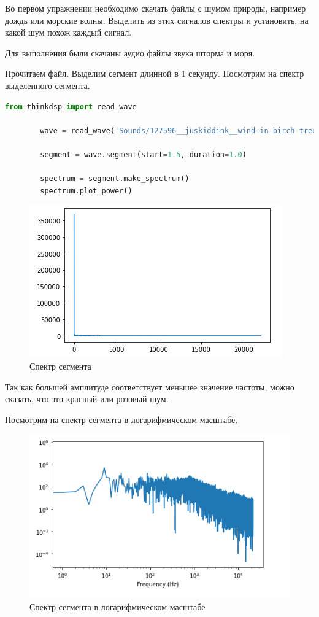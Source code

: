 \documentclass[a4paper, 14pt]{extarticle}
\begin{document}
    Во первом упражнении необходимо скачать файлы с шумом природы, например дождь или морские волны.
    Выделить из этих сигналов спектры и установить, на какой шум похож каждый сигнал.

    Для выполнения были скачаны аудио файлы звука шторма и моря.

    Прочитаем файл.
    Выделим сегмент длинной в 1 секунду.
    Посмотрим на спектр выделенного сегмента.

    \begin{lstlisting}[language=Python, caption={Чтение файла, выделение фрагмента, вывод спектра}, label={lst:read_segment_spectr}]
        from thinkdsp import read_wave

        wave = read_wave('Sounds/127596__juskiddink__wind-in-birch-trees-a-passing-sheep.wav')

        segment = wave.segment(start=1.5, duration=1.0)

        spectrum = segment.make_spectrum()
        spectrum.plot_power()
    \end{lstlisting}

    \begin{figure}[H]
        \centering
        \includegraphics[width=0.8\linewidth]{wind_segment_spectr}
        \caption{Спектр сегмента}
        \label{fig:wind_segment_spectr}
    \end{figure}

    Так как большей амплитуде соответствует меньшее значение частоты, можно сказать, что это красный или розовый шум.

    Посмотрим на спектр сегмента в логарифмическом масштабе.

    \begin{figure}[H]
        \centering
        \includegraphics[width=0.8\linewidth]{wind_spectr_segment_log}
        \caption{Спектр сегмента в логарифмическом масштабе}
        \label{fig:wind_spectr_segment_log}
    \end{figure}
\end{document}
